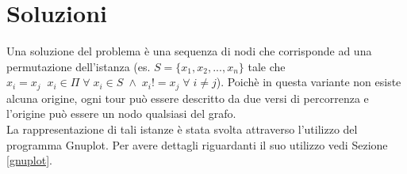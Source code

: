\section{Soluzioni}
Una soluzione del problema è una sequenza di nodi che corrisponde ad una permutazione dell'istanza (es. $S = \{x_1,x_2,...,x_n\}$ tale che $x_i=x_j\;\;x_i \in \Pi\;\forall\;x_i\in S\;\wedge\; x_i!=x_j\;\forall\;i\neq j$). Poichè in questa variante non esiste alcuna origine, ogni tour può essere descritto da due versi di percorrenza e l'origine può essere un nodo qualsiasi del grafo.\\
La rappresentazione di tali istanze è stata svolta attraverso l'utilizzo del programma Gnuplot. Per avere dettagli riguardanti il suo utilizzo vedi Sezione \ref{gnuplot}.